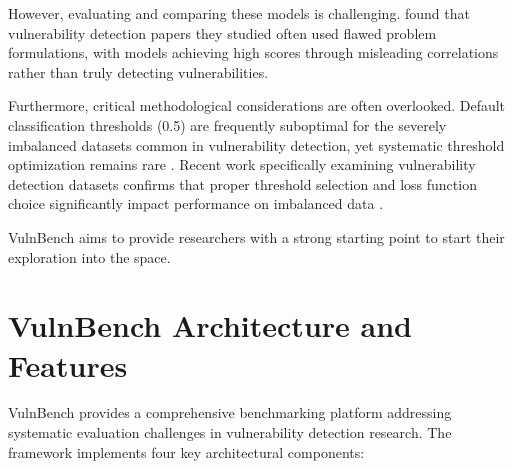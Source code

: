 \documentclass[letterpaper]{article}
\begin{document}
However, evaluating and comparing these models is challenging. \cite{risse2025top} found that vulnerability detection papers they studied often used flawed problem formulations, with models achieving high scores through misleading correlations rather than truly detecting vulnerabilities.

Furthermore, critical methodological considerations are often overlooked. Default classification thresholds (0.5) are frequently suboptimal for the severely imbalanced datasets common in vulnerability detection, yet systematic threshold optimization remains rare \citep{ghost2021, leevy2023optimal}. Recent work specifically examining vulnerability detection datasets confirms that proper threshold selection and loss function choice significantly impact performance on imbalanced data \citep{he2025imbalance}.

VulnBench aims to provide researchers with a strong starting point to start their exploration into the space.

\section{VulnBench Architecture and Features}

VulnBench provides a comprehensive benchmarking platform addressing systematic evaluation challenges in vulnerability detection research. The framework implements four key architectural components:
\end{document}
